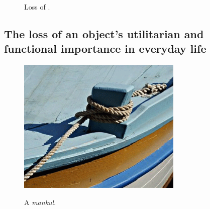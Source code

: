 \documentclass[output=paper]{LSP/langsci}
\begin{document}
\begin{figure}

\caption{Loss of .}
\label{fig:2}
\end{figure}


\subsection{The loss of an object’s utilitarian and functional importance in everyday life}
\begin{figure}[p]
\includegraphics[width=0.7\textwidth]{illustrations/skevin_fig3_mankul}
\label{fig3_mankul}
\caption{A \textit{mankul}.}
\end{figure}
 
\end{document}
